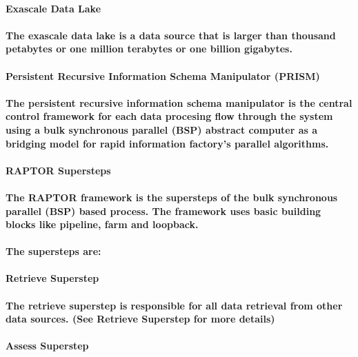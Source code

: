\documentclass{acm_proc_article-sp}
\begin{document}
\paragraph{\textbf{Exascale Data Lake}}
\paragraph{The exascale data lake is a data source that is larger than thousand petabytes or one million terabytes or one billion gigabytes.}
\paragraph{\textbf{Persistent Recursive Information Schema Manipulator (PRISM)}}
\paragraph{The persistent recursive information schema manipulator is the central control framework for each data procesing flow through the system using a bulk synchronous parallel (BSP) abstract computer as a bridging model for rapid information factory's parallel algorithms.}
\paragraph{\textbf{RAPTOR Supersteps}}
\paragraph{The RAPTOR framework is the supersteps of the bulk synchronous parallel (BSP) based process. The framework uses basic building blocks like pipeline, farm and loopback.}
\paragraph{The supersteps are:}
\paragraph{\textbf{Retrieve Superstep}}
\paragraph{The retrieve superstep is responsible for all data retrieval from other data sources. (See Retrieve Superstep for more details)}
\paragraph{\textbf{Assess Superstep}}
\end{document}
